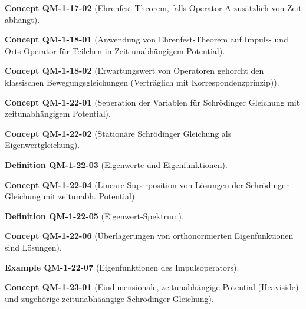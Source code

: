 \documentclass[10pt, letterpaper]{article}
\newcommand{\CustomHeading}[3]{%
  \par\medskip\noindent%
  \textbf{#1 #2} \textnormal{(#3)}.\enskip%
}
\newenvironment{DEF}[2]{\CustomHeading{Definition}{#1}{#2}}{}
\newenvironment{EXA}[2]{\CustomHeading{Example}{#1}{#2}}{}
\newenvironment{CONC}[2]{\CustomHeading{Concept}{#1}{#2}}{}
\begin{document}
\begin{CONC}{QM-1-17-02}{Ehrenfest-Theorem, falls Operator A zusätzlich von Zeit abhängt}
\end{CONC}

\begin{CONC}{QM-1-18-01}{Anwendung von Ehrenfest-Theorem auf Impuls- und Orts-Operator für Teilchen in Zeit-unabhängigem Potential}
\end{CONC}

\begin{CONC}{QM-1-18-02}{Erwartungswert von Operatoren gehorcht den klassischen Bewegungsgleichungen (Verträglich mit Korrespondenzprinzip)}
\end{CONC}

\begin{CONC}{QM-1-22-01}{Seperation der Variablen für Schrödinger Gleichung mit zeitunabhängigem Potential}
\end{CONC}

\begin{CONC}{QM-1-22-02}{Stationäre Schrödinger Gleichung als Eigenwertgleichung}
\end{CONC}

\begin{DEF}{QM-1-22-03}{Eigenwerte und Eigenfunktionen}
\end{DEF}

\begin{CONC}{QM-1-22-04}{Lineare Superposition von Lösungen der Schrödinger Gleichung mit zeitunabh. Potential}
\end{CONC}

\begin{DEF}{QM-1-22-05}{Eigenwert-Spektrum}
\end{DEF}

\begin{CONC}{QM-1-22-06}{Überlagerungen von orthonormierten Eigenfunktionen sind Lösungen}
\end{CONC}

\begin{EXA}{QM-1-22-07}{Eigenfunktionen des Impulsoperators}
\end{EXA}

\begin{CONC}{QM-1-23-01}{Eindimensionale, zeitunabhängige Potential (Heaviside) und zugehörige zeitunabhäängige Schrödinger Gleichung}
\end{CONC}
\end{document}
